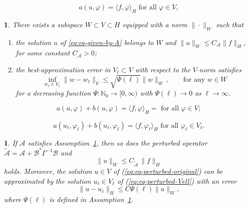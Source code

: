 \documentclass[10pt,a4paper]{amsart}
\newtheorem{assumption}{}
\newtheorem{lem}{}
\newcommand{\jg}[1]{#1}
\begin{document}
\begin{equation}
	a(u,\varphi)=\langle f,\varphi\rangle_{H}\text{ for all }\varphi\in V,\label{eq:eq-given-by-A}
\end{equation}

\begin{assumption}
	\label{assu:WtoH-best-Vell-approx}There exists a subspace 
	$W\subset V \subset H$ equipped with a norm $\|\cdot\|_W$ such that
        \begin{enumerate}
        \item[(a)] the solution $u$ of \eqref{eq:eq-given-by-A}
	belongs to $W$ and $\|u\|_{W}\leq C_{\mathcal{A}}\|f\|_{H}$,
	for some constant $C_{\mathcal{A}}>0$;
        \item[(b)] the best-approximation error in $V_\ell\subset V$ with respect to
        the $V$-norm satisfies
	\[
        \inf_{w_{\ell}\in  V_{\ell}}\|w-w_{\ell}\|_{V}\leq\sqrt{\Psi(\ell)}\|w\|_{W}\,,\qquad\text{for
                  any }w\in W 
        \]
        for a  decreasing function $\Psi\colon\mathbb{N}_{0}\to[0,\infty)$ \jg{with $\Psi(\ell)\rightarrow 0$ as $\ell\rightarrow \infty$}.
              \end{enumerate}
\end{assumption}

\begin{equation}
	a(u,\varphi)+b(u,\varphi)=\langle f,\varphi\rangle_{H}=\text{ for all }\varphi\in V;\label{eq:eq-perturbed-original}
\end{equation}

\begin{equation}
	a(u_{\ell},\varphi_{\ell})+b(u_{\ell},\varphi_{\ell})=\langle f,\varphi_{\ell}\rangle_{H}\text{ for all }\varphi_{\ell}\in V_{\ell}.\label{eq:eq-perturbed-Vell}
\end{equation}

\begin{lem}\label{lem:approximation-perturbed}
	If $\mathcal{A}$ satisfies Assumption~\ref{assu:WtoH-best-Vell-approx},
	then so does the perturbed operator $\widetilde{\mathcal{A}}=\mathcal{A}+\mathcal{B}^{*}\Gamma^{-1}\mathcal{B}$ and
	\begin{equation}
		\|u\|_{W}  \leq C_{\widetilde{\mathcal{A}}}\,\|f\|_{H}\label{eq:perturbedu-Wnorm-bound}
	\end{equation}
	holds. Moreover, the solution $u\in V$ of (\ref{eq:eq-perturbed-original})
	can be approximated by the solution $u_{\ell}\in V_{\ell}$ of (\ref{eq:eq-perturbed-Vell})
	with an error
	\begin{equation}
		\|u-u_{\ell}\|_{H}\leq C\Psi(\ell)\|u\|_{W},\label{eq:perturbed-H-W-bound}
              \end{equation}
          where $\Psi(\ell)$ is defined in Assumption~\ref{assu:WtoH-best-Vell-approx}.
\end{lem}
\end{document}
